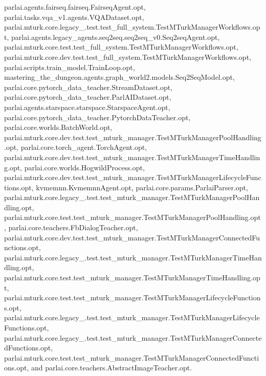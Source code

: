 parlai.\+agents.\+fairseq.\+fairseq.\+Fairseq\+Agent.\+opt, parlai.\+tasks.\+vqa\+\_\+v1.\+agents.\+V\+Q\+A\+Dataset.\+opt, parlai.\+mturk.\+core.\+legacy\+\_.\+test.\+test\+\_\+full\+\_\+system.\+Test\+M\+Turk\+Manager\+Workflows.\+opt, parlai.\+agents.\+legacy\+\_\+agents.\+seq2seq.\+seq2seq\+\_\+v0.\+Seq2seq\+Agent.\+opt, parlai.\+mturk.\+core.\+test.\+test\+\_\+full\+\_\+system.\+Test\+M\+Turk\+Manager\+Workflows.\+opt, parlai.\+mturk.\+core.\+dev.\+test.\+test\+\_\+full\+\_\+system.\+Test\+M\+Turk\+Manager\+Workflows.\+opt, parlai.\+scripts.\+train\+\_\+model.\+Train\+Loop.\+opt, mastering\+\_\+the\+\_\+dungeon.\+agents.\+graph\+\_\+world2.\+models.\+Seq2\+Seq\+Model.\+opt, parlai.\+core.\+pytorch\+\_\+data\+\_\+teacher.\+Stream\+Dataset.\+opt, parlai.\+core.\+pytorch\+\_\+data\+\_\+teacher.\+Parl\+A\+I\+Dataset.\+opt, parlai.\+agents.\+starspace.\+starspace.\+Starspace\+Agent.\+opt, parlai.\+core.\+pytorch\+\_\+data\+\_\+teacher.\+Pytorch\+Data\+Teacher.\+opt, parlai.\+core.\+worlds.\+Batch\+World.\+opt, parlai.\+mturk.\+core.\+dev.\+test.\+test\+\_\+mturk\+\_\+manager.\+Test\+M\+Turk\+Manager\+Pool\+Handling.\+opt, parlai.\+core.\+torch\+\_\+agent.\+Torch\+Agent.\+opt, parlai.\+mturk.\+core.\+dev.\+test.\+test\+\_\+mturk\+\_\+manager.\+Test\+M\+Turk\+Manager\+Time\+Handling.\+opt, parlai.\+core.\+worlds.\+Hogwild\+Process.\+opt, parlai.\+mturk.\+core.\+dev.\+test.\+test\+\_\+mturk\+\_\+manager.\+Test\+M\+Turk\+Manager\+Lifecycle\+Functions.\+opt, kvmemnn.\+Kvmemnn\+Agent.\+opt, parlai.\+core.\+params.\+Parlai\+Parser.\+opt, parlai.\+mturk.\+core.\+legacy\+\_.\+test.\+test\+\_\+mturk\+\_\+manager.\+Test\+M\+Turk\+Manager\+Pool\+Handling.\+opt, parlai.\+mturk.\+core.\+test.\+test\+\_\+mturk\+\_\+manager.\+Test\+M\+Turk\+Manager\+Pool\+Handling.\+opt, parlai.\+core.\+teachers.\+Fb\+Dialog\+Teacher.\+opt, parlai.\+mturk.\+core.\+dev.\+test.\+test\+\_\+mturk\+\_\+manager.\+Test\+M\+Turk\+Manager\+Connected\+Functions.\+opt, parlai.\+mturk.\+core.\+legacy\+\_.\+test.\+test\+\_\+mturk\+\_\+manager.\+Test\+M\+Turk\+Manager\+Time\+Handling.\+opt, parlai.\+mturk.\+core.\+test.\+test\+\_\+mturk\+\_\+manager.\+Test\+M\+Turk\+Manager\+Time\+Handling.\+opt, parlai.\+mturk.\+core.\+test.\+test\+\_\+mturk\+\_\+manager.\+Test\+M\+Turk\+Manager\+Lifecycle\+Functions.\+opt, parlai.\+mturk.\+core.\+legacy\+\_.\+test.\+test\+\_\+mturk\+\_\+manager.\+Test\+M\+Turk\+Manager\+Lifecycle\+Functions.\+opt, parlai.\+mturk.\+core.\+legacy\+\_.\+test.\+test\+\_\+mturk\+\_\+manager.\+Test\+M\+Turk\+Manager\+Connected\+Functions.\+opt, parlai.\+mturk.\+core.\+test.\+test\+\_\+mturk\+\_\+manager.\+Test\+M\+Turk\+Manager\+Connected\+Functions.\+opt, and parlai.\+core.\+teachers.\+Abstract\+Image\+Teacher.\+opt.




